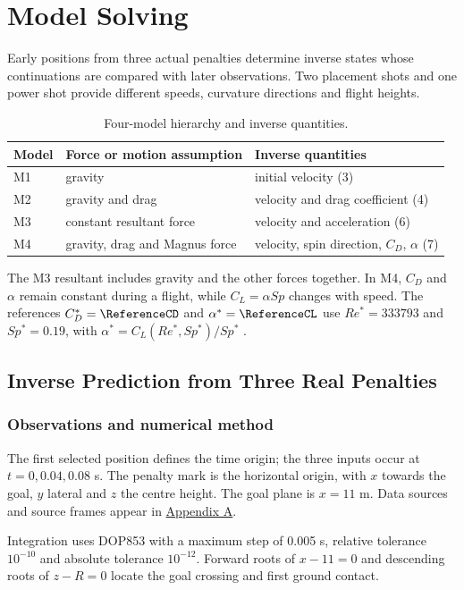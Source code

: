 \section{Model Solving}\label{sec:solving}
Early positions from three actual penalties determine inverse states whose continuations are compared with later observations. Two placement shots and one power shot provide different speeds, curvature directions and flight heights.
\begin{table}[H]\centering\small\caption{Four-model hierarchy and inverse quantities.}\label{tab:models}
\begin{tabular}{lll}\toprule
Model & Force or motion assumption & Inverse quantities\\\midrule
M1 & gravity & initial velocity (3)\\
M2 & gravity and drag & velocity and drag coefficient (4)\\
M3 & constant resultant force & velocity and acceleration (6)\\
M4 & gravity, drag and Magnus force & velocity, spin direction, $C_D$, $\alpha$ (7)\\\bottomrule
\end{tabular}\end{table}
The M3 resultant includes gravity and the other forces together. In M4, $C_D$ and $\alpha$ remain constant during a flight, while $C_L=\alpha Sp$ changes with speed. The references $C_D^*=\ReferenceCD$ and $\alpha^*=\ReferenceCL$ use $Re^*=333793$ and $Sp^*=0.19$, with $\alpha^*=C_L(Re^*,Sp^*)/Sp^*$ \cite{kiratidis2018}.

\subsection{Inverse Prediction from Three Real Penalties}\label{sec:inverse}
\subsubsection{Observations and numerical method}
The first selected position defines the time origin; the three inputs occur at $t=0,0.04,0.08$ s. The penalty mark is the horizontal origin, with $x$ towards the goal, $y$ lateral and $z$ the centre height. The goal plane is $x=11$ m. Data sources and source frames appear in \hyperref[app:data]{Appendix A}.

Integration uses DOP853 with a maximum step of 0.005 s, relative tolerance $10^{-10}$ and absolute tolerance $10^{-12}$. Forward roots of $x-11=0$ and descending roots of $z-R=0$ locate the goal crossing and first ground contact.


